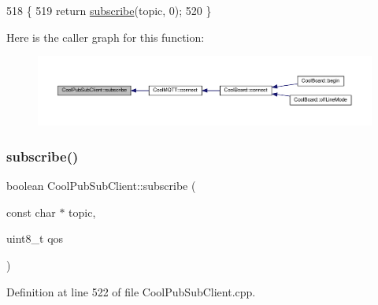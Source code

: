 \begin{DoxyCode}
518                                                      \{
519     \textcolor{keywordflow}{return} \hyperlink{class_cool_pub_sub_client_ac1ebc9ad874128aefa985d78496d2e8f}{subscribe}(topic, 0);
520 \}
\end{DoxyCode}
Here is the caller graph for this function\+:\nopagebreak
\begin{figure}[H]
\begin{center}
\leavevmode
\includegraphics[width=350pt]{d8/d4b/class_cool_pub_sub_client_ac1ebc9ad874128aefa985d78496d2e8f_icgraph}
\end{center}
\end{figure}
\mbox{\label{class_cool_pub_sub_client_aebf684e98588c52a72af1014f7957bee}} 
\subsubsection{\texorpdfstring{subscribe()}{subscribe()}\hspace{0.1cm}{\footnotesize\ttfamily [2/2]}}
{\footnotesize\ttfamily boolean Cool\+Pub\+Sub\+Client\+::subscribe (\begin{DoxyParamCaption}\item[{const char $\ast$}]{topic,  }\item[{uint8\+\_\+t}]{qos }\end{DoxyParamCaption})}



Definition at line 522 of file Cool\+Pub\+Sub\+Client.\+cpp.


